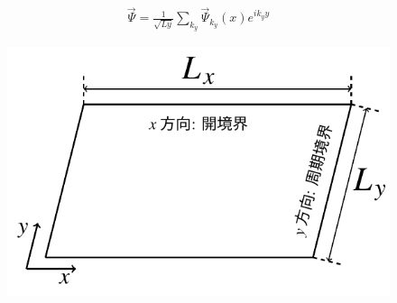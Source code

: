 \documentclass{jsarticle}
\begin{document}
		\begin{align}
			\vec{\Psi}=\frac{1}{\sqrt{Ly}}\sum_{k_y} \vec{\Psi}_{k_y}(x) e^{ik_yy}
		\end{align}

		\begin{figure}[H]
			\centering
			\includegraphics[width=0.7\linewidth]{figure1}
			\caption{}
			\label{fig:figure1}
		\end{figure}
\end{document}
